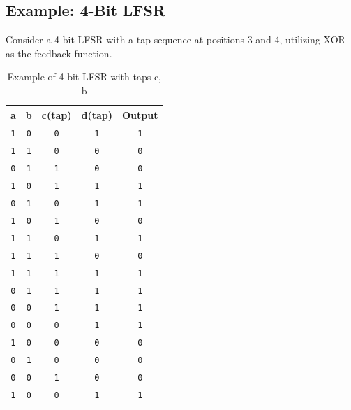\subsection{Example: 4-Bit LFSR}
Consider a 4-bit LFSR with a tap sequence at positions 3 and 4, utilizing XOR as the feedback function. 

\begin{table}[h]
\centering
\begin{tabular}{c c c c c}
\toprule
\textbf{a} & \textbf{b} & \textbf{c(tap)} & \textbf{d(tap)} & \textbf{Output} \\
\midrule
\texttt{1} & \texttt{0} & \texttt{0} & \texttt{1} & \texttt{1} \\
\texttt{1} & \texttt{1} & \texttt{0} & \texttt{0} & \texttt{0}  \\
\texttt{0} & \texttt{1} & \texttt{1} & \texttt{0} & \texttt{0}  \\
\texttt{1} & \texttt{0} & \texttt{1} & \texttt{1} & \texttt{1}  \\
\texttt{0} & \texttt{1} & \texttt{0} & \texttt{1} & \texttt{1}  \\
\texttt{1} & \texttt{0} & \texttt{1} & \texttt{0} & \texttt{0}  \\
\texttt{1} & \texttt{1} & \texttt{0} & \texttt{1} & \texttt{1}  \\
\texttt{1} & \texttt{1} & \texttt{1} & \texttt{0} & \texttt{0}  \\
\texttt{1} & \texttt{1} & \texttt{1} & \texttt{1} & \texttt{1}  \\
\texttt{0} & \texttt{1} & \texttt{1} & \texttt{1} & \texttt{1}  \\
\texttt{0} & \texttt{0} & \texttt{1} & \texttt{1} & \texttt{1}  \\
\texttt{0} & \texttt{0} & \texttt{0} & \texttt{1} & \texttt{1}  \\
\texttt{1} & \texttt{0} & \texttt{0} & \texttt{0} & \texttt{0}  \\
\texttt{0} & \texttt{1} & \texttt{0} & \texttt{0} & \texttt{0}  \\
\texttt{0} & \texttt{0} & \texttt{1} & \texttt{0} & \texttt{0}  \\
\texttt{1} & \texttt{0} & \texttt{0} & \texttt{1} & \texttt{1}  \\
\bottomrule
\end{tabular}
\caption{Example of 4-bit LFSR with taps c, b}
\end{table}